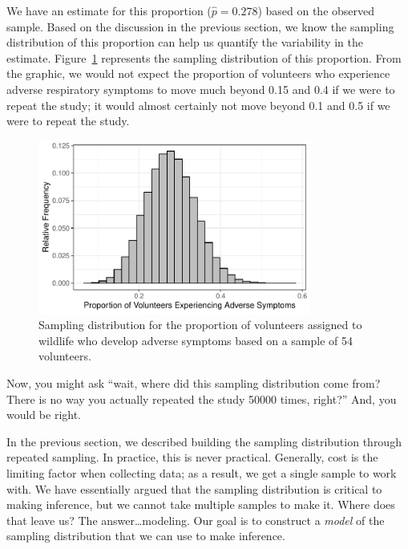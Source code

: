 \documentclass[
  letterpaper,
  DIV=11,
  numbers=noendperiod]{scrreprt}
\theoremstyle{definition}
\theoremstyle{definition}
\theoremstyle{plain}
\theoremstyle{remark}
\begin{document}
We have an estimate for this proportion (\(\widehat{p} = 0.278\)) based
on the observed sample. Based on the discussion in the previous section,
we know the sampling distribution of this proportion can help us
quantify the variability in the estimate.
Figure~\ref{fig-samplingdistns-deepwater-histogram} represents the
sampling distribution of this proportion. From the graphic, we would not
expect the proportion of volunteers who experience adverse respiratory
symptoms to move much beyond 0.15 and 0.4 if we were to repeat the
study; it would almost certainly not move beyond 0.1 and 0.5 if we were
to repeat the study.

\begin{figure}

{\centering \includegraphics[width=0.8\textwidth,height=\textheight]{./images/fig-samplingdistns-deepwater-histogram-1.pdf}

}

\caption{\label{fig-samplingdistns-deepwater-histogram}Sampling
distribution for the proportion of volunteers assigned to wildlife who
develop adverse symptoms based on a sample of 54 volunteers.}

\end{figure}

Now, you might ask ``wait, where did this sampling distribution come
from? There is no way you actually repeated the study 50000 times,
right?'' And, you would be right.

In the previous section, we described building the sampling distribution
through repeated sampling. In practice, this is never practical.
Generally, cost is the limiting factor when collecting data; as a
result, we get a single sample to work with. We have essentially argued
that the sampling distribution is critical to making inference, but we
cannot take multiple samples to make it. Where does that leave us? The
answer\ldots modeling. Our goal is to construct a \emph{model} of the
sampling distribution that we can use to make inference.
\end{document}
